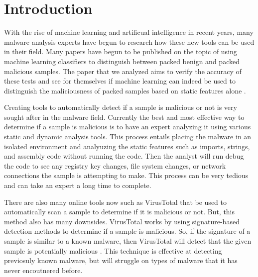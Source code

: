 \documentclass[sigconf]{acmart}
\begin{document}



\maketitle

\section{Introduction}
\label{sec:intro}

With the rise of machine learning and artificual intelligence in recent years, many malware analysis experts have begun to research how these new tools can be used in their field. Many papers have begun to be published on the topic of using machine learning classifiers to distinguish between packed benign and packed malicious samples. The paper that we analyzed aims to verify the accuracy of these tests and see for themselves if machine learning can indeed be used to distinguish the maliciousness of packed samples based on static features alone \cite{Aghakhani2020}. 

Creating tools to automatically detect if a sample is malicious or not is very sought after in the malware field. Currently the best and most effective way to determine if a sample is malicious is to have an expert analyzing it using various static and dynamic analysis tools. This process entails placing the malware in an isolated environment and analyuzing the static features such as imports, strings, and assembly code without running the code. Then the analyst will run debug the code to see any registry key changes, file system changes, or network connections the sample is attempting to make. This process can be very tedious and can take an expert a long time to complete.

There are also many online tools now such as VirusTotal that be used to automatically scan a sample to determine if it is malicious or not. But, this method also has many downsides. VirusTotal works by using signature-based detection methods to determine if a sample is malicious. So, if the signature of a sample is similar to a known malware, then VirusTotal will detect that the given sample is potentially malicious \cite{Aghakhani2020}. This technique is effective at detecting previosuly known malware, but will struggle on types of malware that it has never encoutnered before. 
\end{document}

